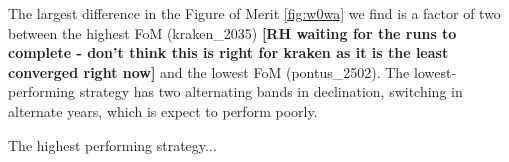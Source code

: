 The largest difference in the Figure of Merit \ref{fig:w0wa} we find is a factor of two between the highest FoM (kraken\_2035) \textbf{[RH waiting for the runs to complete - don't think this is right for kraken as it is the least converged right now]} and the lowest FoM (pontus\_2502). The lowest-performing strategy has two alternating bands in declination, switching in alternate years, which is expect to perform poorly. 


The highest performing strategy...
